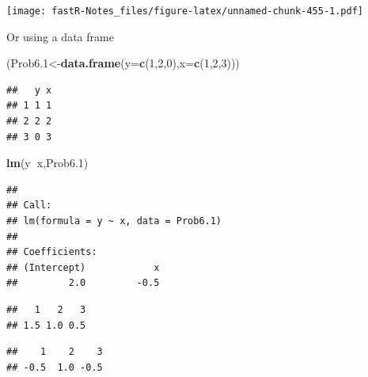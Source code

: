 \documentclass[]{book}
\newenvironment{Shaded}{\begin{snugshade}}{\end{snugshade}}
\newcommand{\KeywordTok}[1]{\textcolor[rgb]{0.13,0.29,0.53}{\textbf{#1}}}
\newcommand{\DataTypeTok}[1]{\textcolor[rgb]{0.13,0.29,0.53}{#1}}
\newcommand{\DecValTok}[1]{\textcolor[rgb]{0.00,0.00,0.81}{#1}}
\newcommand{\OperatorTok}[1]{\textcolor[rgb]{0.81,0.36,0.00}{\textbf{#1}}}
\newcommand{\NormalTok}[1]{#1}
\theoremstyle{definition}
\theoremstyle{definition}
\theoremstyle{definition}
\theoremstyle{remark}
\begin{document}
\texttt{[image: fastR-Notes\_files/figure-latex/unnamed-chunk-455-1.pdf]}

Or using a data frame

\begin{Shaded}
\begin{Highlighting}[]
\NormalTok{(Prob6.}\DecValTok{1}\NormalTok{<-}\KeywordTok{data.frame}\NormalTok{(}\DataTypeTok{y=}\KeywordTok{c}\NormalTok{(}\DecValTok{1}\NormalTok{,}\DecValTok{2}\NormalTok{,}\DecValTok{0}\NormalTok{),}\DataTypeTok{x=}\KeywordTok{c}\NormalTok{(}\DecValTok{1}\NormalTok{,}\DecValTok{2}\NormalTok{,}\DecValTok{3}\NormalTok{)))}
\end{Highlighting}
\end{Shaded}

\begin{verbatim}
##   y x
## 1 1 1
## 2 2 2
## 3 0 3
\end{verbatim}

\begin{Shaded}
\begin{Highlighting}[]
\KeywordTok{lm}\NormalTok{(y}\OperatorTok{~}\NormalTok{x,Prob6.}\DecValTok{1}\NormalTok{)}
\end{Highlighting}
\end{Shaded}

\begin{verbatim}
## 
## Call:
## lm(formula = y ~ x, data = Prob6.1)
## 
## Coefficients:
## (Intercept)            x  
##         2.0         -0.5
\end{verbatim}

\begin{Shaded}
\end{Shaded}

\begin{verbatim}
##   1   2   3 
## 1.5 1.0 0.5
\end{verbatim}

\begin{Shaded}
\end{Shaded}

\begin{verbatim}
##    1    2    3 
## -0.5  1.0 -0.5
\end{verbatim}
\end{document}
